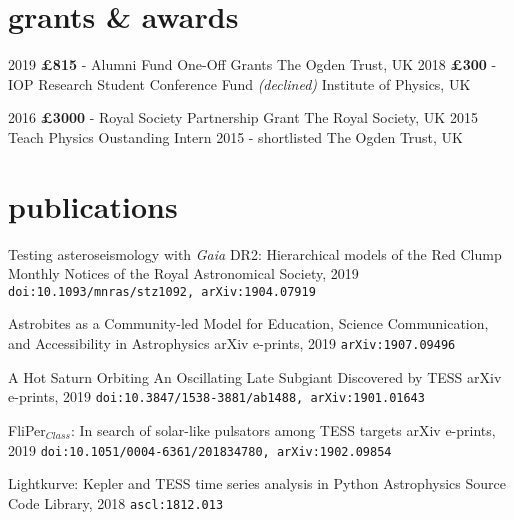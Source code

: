 \documentclass[]{k-cv} %
\begin{document}
\section{grants \& awards}

\begin{entrylist}
\centrythree
{2019}
{\textbf{\pounds 815} - Alumni Fund One-Off Grants}
{The Ogden Trust, UK}
\centrythree
{2018}
{\textbf{\pounds 300} - IOP Research Student Conference Fund \emph{(declined)}}
{Institute of Physics, UK}

\centrythree
{2016}
{\textbf{\pounds 3000} - Royal Society Partnership Grant}
{The Royal Society, UK}
\centrythree
{2015}
{Teach Physics Oustanding Intern 2015 - shortlisted}
{The Ogden Trust, UK}

\end{entrylist}

\section{publications}
{Testing asteroseismology with \textit{Gaia} DR2: Hierarchical models of the Red Clump}
{Monthly Notices of the Royal Astronomical Society, 2019}
{\texttt{doi:10.1093/mnras/stz1092, arXiv:1904.07919}}

{Astrobites as a Community-led Model for Education, Science Communication, and Accessibility in Astrophysics}
{arXiv e-prints, 2019}
{\texttt{arXiv:1907.09496}}

{{A Hot Saturn Orbiting An Oscillating Late Subgiant Discovered by TESS}}
{arXiv e-prints, 2019}
{\texttt{doi:10.3847/1538-3881/ab1488, arXiv:1901.01643}}

{FliPer$_{Class}$: In search of solar-like pulsators among TESS targets}
{arXiv e-prints, 2019}
{\texttt{doi:10.1051/0004-6361/201834780, arXiv:1902.09854}}

{Lightkurve: Kepler and TESS time series analysis in Python}
{Astrophysics Source Code Library, 2018}
{\texttt{ascl:1812.013}}
\end{document}
